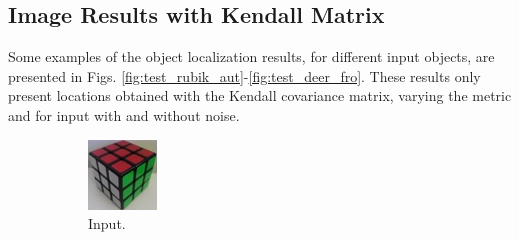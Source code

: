 \documentclass[11pt]{article}
\theoremstyle{definition}
\theoremstyle{remark}
\theoremstyle{remark}
\theoremstyle{remark}
\begin{document}
\subsection{Image Results with Kendall Matrix}
Some examples of the object localization results, for different input objects,
are presented in Figs. \ref{fig:test_rubik_aut}-\ref{fig:test_deer_fro}. These
results only present locations obtained with the Kendall covariance matrix,
varying the metric and for input with and without noise.
%
\begin{figure}[H]
  \centering
  \begin{subfigure}[b]{0.32\textwidth}
    \centering \includegraphics[width=\textwidth]{figs/input2.jpg}
    \caption{Input.}
  \end{subfigure}
  \begin{subfigure}[b]{0.32\textwidth}

\end{subfigure}
\end{figure}
\end{document}
